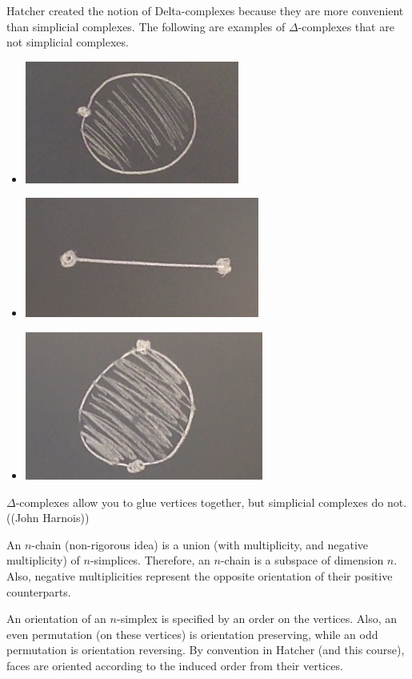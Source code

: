 \documentclass[11pt,leqno,oneside]{amsart}
\numberwithin{thm}{section}
\begin{document}
\begin{rmk}
  Hatcher created the notion of Delta-complexes because they are more
  convenient than simplicial complexes.  The following are examples of
  $\Delta$-complexes that are not simplicial complexes.
  \begin{itemize}
  \item \includegraphics[scale=0.22]{images/not-delta-complex1}
  \item \includegraphics[scale=0.2]{images/not-delta-complex2}
  \item \includegraphics[scale=0.2]{images/not-delta-complex3}
  \end{itemize}
  $\Delta$-complexes allow you to glue vertices together, but
  simplicial complexes do not. ((John Harnois))
\end{rmk}

An $n$-chain (non-rigorous idea) is a union (with multiplicity, and
negative multiplicity) of $n$-simplices.  Therefore, an $n$-chain is a
subspace of dimension $n$.  Also, negative multiplicities represent
the opposite orientation of their positive counterparts.

An orientation of an $n$-simplex is specified by an order on the
vertices.  Also, an even permutation (on these vertices) is
orientation preserving, while an odd permutation is orientation
reversing.  By convention in Hatcher (and this course), faces are
oriented according to the induced order from their vertices.
\end{document}

